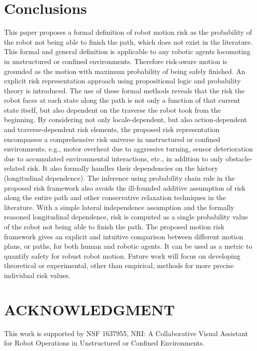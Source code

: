 \documentclass[letterpaper]{article} %
\begin{document}
\section{Conclusions}
This paper proposes a formal definition of robot motion risk as the probability of the robot not being able to finish the path, which does not exist in the literature. This formal and general definition is applicable to any robotic agents locomoting in unstructured or confined environments. Therefore risk-aware motion is grounded as the motion with maximum probability of being safely finished. An explicit risk representation approach using propositional logic and probability theory is introduced. The use of these formal methods reveals that the risk the robot faces at each state along the path is not only a function of that current state itself, but also dependent on the traverse the robot took from the beginning. By considering not only locale-dependent, but also action-dependent and traverse-dependent risk elements, the proposed risk representation encompasses a comprehensive risk universe in unstructured or confined environments, e.g., motor overheat due to aggressive turning, sensor deterioration due to accumulated environmental interactions, etc., in addition to only obstacle-related risk. It also formally handles their dependencies on the history (longitudinal dependence). The inference using probability chain rule in the proposed risk framework also avoids the ill-founded additive assumption of risk along the entire path and other conservative relaxation techniques in the literature. With a simple lateral independence assumption and the formally reasoned longitudinal dependence, risk is computed as a single probability value of the robot not being able to finish the path. The proposed motion risk framework gives an explicit and intuitive comparison between different motion plans, or paths, for both human and robotic agents. It can be used as a metric to quantify safety for robust robot motion. Future work will focus on developing theoretical or experimental, other than empirical, methods for more precise individual risk values. 


\section{ACKNOWLEDGMENT}
This work is supported by NSF 1637955, NRI: A Collaborative Visual Assistant for Robot Operations in Unstructured or Confined Environments. 

\clearpage


\end{document}
